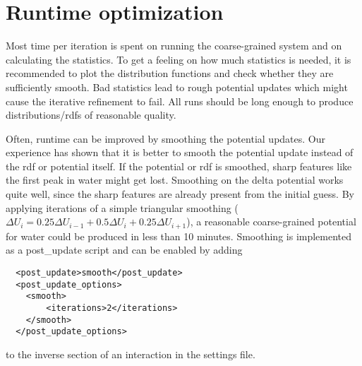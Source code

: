 \section{Runtime optimization}
\label{ref:ibi:optimize}
Most time per iteration is spent on running the coarse-grained system and on calculating the statistics. To get a feeling on how much statistics is needed, it is recommended to plot the distribution functions and check whether they are sufficiently smooth. Bad statistics lead to rough potential updates which might cause the iterative refinement to fail. All runs should be long enough to produce distributions/rdfs of reasonable quality.

Often, runtime can be improved by smoothing the potential updates. Our experience has shown that it is better to smooth the potential update instead of the rdf or potential itself. If the potential or rdf is smoothed, sharp features like the first peak in \spce water might get lost. Smoothing on the delta potential works quite well, since the sharp features are already present from the initial guess. By applying iterations of a simple triangular smoothing ($ \Delta U_i = 0.25 \Delta U_{i-1} + 0.5\Delta U_i + 0.25\Delta U_{i+1} $), a reasonable coarse-grained potential for \spce water could be produced in less than 10 minutes. Smoothing is implemented as a post\_update script and can be enabled by adding
\begin{lstlisting}
  <post_update>smooth</post_update>
  <post_update_options>
    <smooth>
        <iterations>2</iterations>
    </smooth>
  </post_update_options>
\end{lstlisting}
to the inverse section of an interaction in the settings \xml file.


